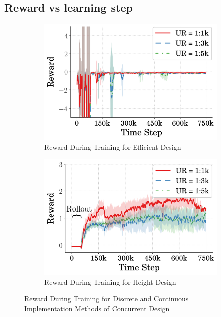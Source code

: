 \subsection{Reward vs learning step}
%  
\begin{figure}[tb!]
  \centering
  \begin{subfigure}{.49\textwidth}
          \centering
          \includegraphics[width=\textwidth]{figures/Ch5/comp_update_rate/avg_eff_rew_.png}  
          \caption{Reward During Training for Efficient Design}
          \label{fig:comp_ur_rew_eff}
  \end{subfigure}%
  \hfill
  \begin{subfigure}{.49\textwidth}
          \centering
          \includegraphics[width=\textwidth]{figures/Ch5/comp_update_rate/avg_hei_rew_.png}  
          \caption{Reward During Training for Height Design}
          \label{fig:comp_ur_rew_high}
  \end{subfigure}
   \caption{Reward During Training for Discrete and Continuous Implementation Methods of Concurrent Design}
   \label{fig:comp_ur_rew}
\end{figure}
